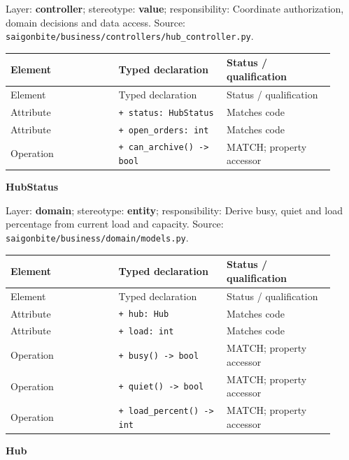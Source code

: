 Layer: \textbf{controller}; stereotype: \textbf{\guillemotleft{}value\guillemotright{}}; responsibility: Coordinate authorization, domain decisions and data access. Source: \texttt{saigonbite/\allowbreak{}business/\allowbreak{}controllers/\allowbreak{}hub\_\allowbreak{}controller.\allowbreak{}py}.

\begin{longtable}{>{\raggedright\arraybackslash}p{0.3067\linewidth}>{\raggedright\arraybackslash}p{0.3067\linewidth}>{\raggedright\arraybackslash}p{0.3067\linewidth}}
Element & Typed declaration & Status / qualification \\
\hline\endfirsthead
Element & Typed declaration & Status / qualification \\
\hline\endhead
Attribute & \texttt{+ status: HubStatus} & Matches code \\
Attribute & \texttt{+ open\_\allowbreak{}orders: int} & Matches code \\
Operation & \texttt{+ can\_\allowbreak{}archive() -\textgreater{} bool} & MATCH; property accessor \\
\end{longtable}
\textbf{HubStatus}

Layer: \textbf{domain}; stereotype: \textbf{\guillemotleft{}entity\guillemotright{}}; responsibility: Derive busy, quiet and load percentage from current load and capacity. Source: \texttt{saigonbite/\allowbreak{}business/\allowbreak{}domain/\allowbreak{}models.\allowbreak{}py}.

\begin{longtable}{>{\raggedright\arraybackslash}p{0.3067\linewidth}>{\raggedright\arraybackslash}p{0.3067\linewidth}>{\raggedright\arraybackslash}p{0.3067\linewidth}}
Element & Typed declaration & Status / qualification \\
\hline\endfirsthead
Element & Typed declaration & Status / qualification \\
\hline\endhead
Attribute & \texttt{+ hub: Hub} & Matches code \\
Attribute & \texttt{+ load: int} & Matches code \\
Operation & \texttt{+ busy() -\textgreater{} bool} & MATCH; property accessor \\
Operation & \texttt{+ quiet() -\textgreater{} bool} & MATCH; property accessor \\
Operation & \texttt{+ load\_\allowbreak{}percent() -\textgreater{} int} & MATCH; property accessor \\
\end{longtable}
\textbf{Hub}

